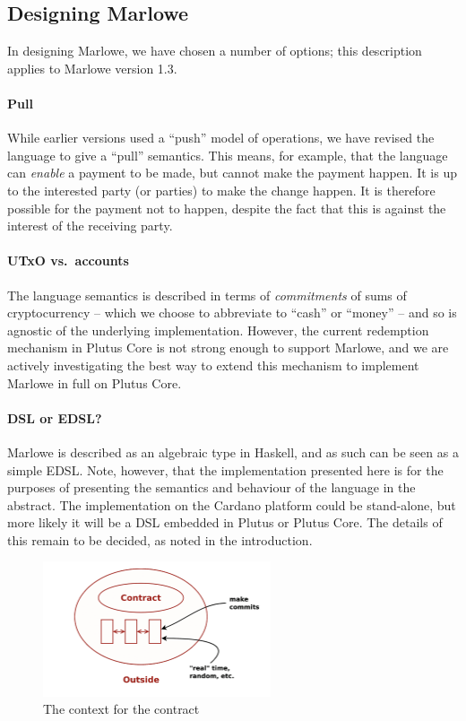 \documentclass[runningheads]{llncs}
\begin{document}
\subsection{Designing Marlowe}

In designing Marlowe, we have chosen a number of options; this description applies to Marlowe version 1.3. 

\paragraph{Pull} 

While earlier versions used a ``push'' model of operations, we have revised the language to give a ``pull'' semantics. 
This means, for example, that the language can \emph{enable} a payment to be made, but cannot make the payment happen. 
It is up to the interested party (or parties) to make the change happen. It is therefore possible for the payment not to 
happen, despite the fact that this is against the interest of the receiving party.


\paragraph{UTxO vs.\ accounts}

The language semantics is described in terms of \emph{commitments} of sums of cryptocurrency -- which we choose to 
abbreviate to ``cash'' or ``money'' -- and so is agnostic of the underlying implementation.  However, the current 
redemption mechanism in Plutus Core is not strong enough to support Marlowe, and we are actively investigating the best 
way to extend this mechanism to implement Marlowe in full on Plutus Core.

\paragraph{DSL or EDSL?}

Marlowe is described as an algebraic  type in Haskell, and as such can be seen as a simple EDSL. 
Note, however, that the implementation presented here is for the purposes of presenting the semantics and behaviour of 
the language in the abstract. The implementation on the Cardano platform could be stand-alone, but more likely it will 
be a DSL embedded in Plutus or Plutus Core. The details of this remain to be decided, as noted in the introduction.

\begin{figure}[t]
\begin{center}
\includegraphics[width=0.6\textwidth]{pix/context.png}
\caption{The context for the contract}
\label{fig:context}
\end{center}
\end{figure}
\end{document}
